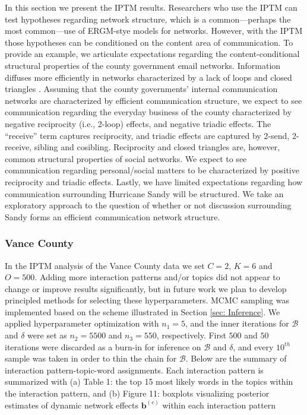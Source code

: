 \documentclass[a4paper]{article}
\begin{document}
   In this section we present the IPTM results. Researchers who use the IPTM can test hypotheses regarding network structure, which is a common---perhaps the most common---use of ERGM-stye models for networks. However, with the IPTM those hypotheses can be conditioned on the content area of communication. To provide an example, we articulate expectations regarding the content-conditional structural properties of the county government email networks. Information diffuses more efficiently in networks characterized by a lack of loops \citep{lin2010measuring,iribarren2011branching} and closed triangles \citep{roca2010topological,tadic2004information}. Assuming that the county governments' internal communication networks are characterized by efficient communication structure,  we expect to see communication regarding the everyday business of the county characterized by negative reciprocity (i.e., 2-loop) effects, and negative triadic effects. The ``receive'' term captures reciprocity, and triadic effects are captured by 2-send, 2-receive, sibling and cosibling. Reciprocity and closed triangles are, however, common structural properties of social networks. We expect to see communication regarding personal/social matters to be characterized by positive reciprocity and triadic effects. Lastly, we have limited expectations regarding how communication surrounding Hurricane Sandy will be structured. We take an exploratory approach to the question of whether or not discussion surrounding Sandy forms an efficient communication network structure.
   
          \subsubsection{Vance County}\label{subsubsec:VanceIPTM}
         In the IPTM analysis of the Vance County data we set $C=2$, $K=6$ and $O= 500$. Adding more interaction patterns and/or topics did not appear to change or improve results significantly, but in future work we plan to develop principled methods for selecting these hyperparameters. MCMC sampling was implemented based on the scheme illustrated in Section \ref{sec: Inference}. We applied hyperparameter optimization with $n_1=5$, and the inner iterations for $\mathcal{B}$ and $\delta$ were set as $n_2=5500$ and $n_3 = 550$, respectively. First $500$ and $50$ iterations were discarded as a burn-in for inference on  $\mathcal{B}$ and $\delta$, and every $10^{th}$ sample was taken in order to thin the chain for $\mathcal{B}$. Below are the summary of interaction pattern-topic-word assignments. Each interaction pattern is summarized with (a) Table 1: the top 15 most likely words in the topics within the  interaction pattern, and (b) Figure 11: boxplots visualizing posterior estimates of dynamic network effects $\boldsymbol{b}^{(c)}$ within each interaction pattern
          
\end{document}
